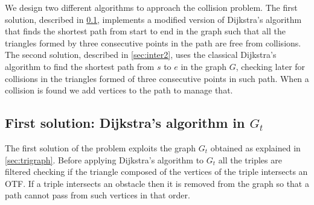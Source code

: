 \documentclass[dissertation.tex]{subfiles}
\begin{document}
We design two different algorithms to approach the collision
problem. The first solution, described in \cref{sec:inter1}, implements
a modified version of Dijkstra's
algorithm that finds the shortest path from start to end in the graph
such that all the triangles formed by three consecutive points in the path
are free from collisions. The second solution, described in
\cref{sec:inter2}, uses the classical Dijkstra's algorithm to find
the shortest path from $s$ to $e$ in the graph $G$, checking later for
collisions in the triangles formed of three consecutive points in such
path. When a collision is found we add vertices to the path to manage that.

\subsection{First solution: Dijkstra's algorithm in $G_t$}\label{sec:inter1}
The first solution of the problem exploits the graph $G_t$ obtained as
explained in \cref{sec:trigraph}. Before applying Dijkstra's algorithm
to $G_t$ all the triples are filtered checking if the
triangle composed of the vertices of the triple intersects an
\ac{OTF}. If a triple intersects an obstacle then it is removed from the
graph
so that a path cannot pass from such vertices in that order.
\end{document}
